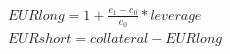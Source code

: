 \begin{align*}
    EURlong =  1 + \frac{e_1 - e_0}{e_0} * leverage  \\
    EURshort =  collateral - EURlong
\end{align*}
